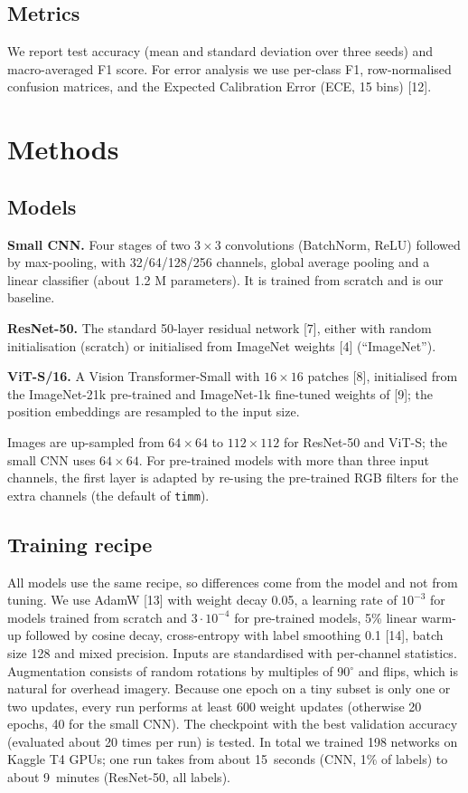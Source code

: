 \documentclass[twoside,a4paper,11pt]{article}
\newcommand{\nruns}{198}
\begin{document}
\subsection{Metrics}

We report test accuracy (mean and standard deviation over three seeds) and macro-averaged F1
score. For error analysis we use per-class F1, row-normalised confusion matrices, and the
Expected Calibration Error (ECE, 15 bins) [12].

\section{Methods}

\subsection{Models}

\textbf{Small CNN.} Four stages of two $3\times3$ convolutions (BatchNorm, ReLU)
followed by max-pooling, with 32/64/128/256 channels, global average pooling and a linear
classifier (about 1.2 M parameters). It is trained from scratch and is our baseline.

\textbf{ResNet-50.} The standard 50-layer residual network [7], either with random
initialisation (scratch) or initialised from ImageNet weights [4] (``ImageNet'').

\textbf{ViT-S/16.} A Vision Transformer-Small with $16\times16$ patches [8], initialised from
the ImageNet-21k pre-trained and ImageNet-1k fine-tuned weights of [9]; the position
embeddings are resampled to the input size.

Images are up-sampled from $64\times64$ to $112\times112$ for ResNet-50 and ViT-S;
the small CNN uses $64\times64$. For pre-trained models with more than three input channels,
the first layer is adapted by re-using the pre-trained RGB filters for the extra channels
(the default of \texttt{timm}).

\subsection{Training recipe}

All models use the same recipe, so differences come from the model and not from
tuning. We use AdamW [13] with weight decay 0.05, a learning rate of $10^{-3}$ for models trained
from scratch and $3\cdot10^{-4}$ for pre-trained models, 5\% linear warm-up followed by cosine decay,
cross-entropy with label smoothing 0.1 [14], batch size 128 and mixed precision. Inputs are
standardised with per-channel statistics. Augmentation consists of random
rotations by multiples of 90$^\circ$ and flips, which is natural for overhead imagery. Because one
epoch on a tiny subset is only one or two updates, every run performs at least 600 weight
updates (otherwise 20 epochs, 40 for the small CNN). The checkpoint with the best validation accuracy
(evaluated about 20 times per run) is tested. In total we trained \nruns{} networks
on Kaggle T4 GPUs; one run takes from about 15~seconds (CNN, 1\% of labels) to about 9~minutes
(ResNet-50, all labels).
\end{document}
